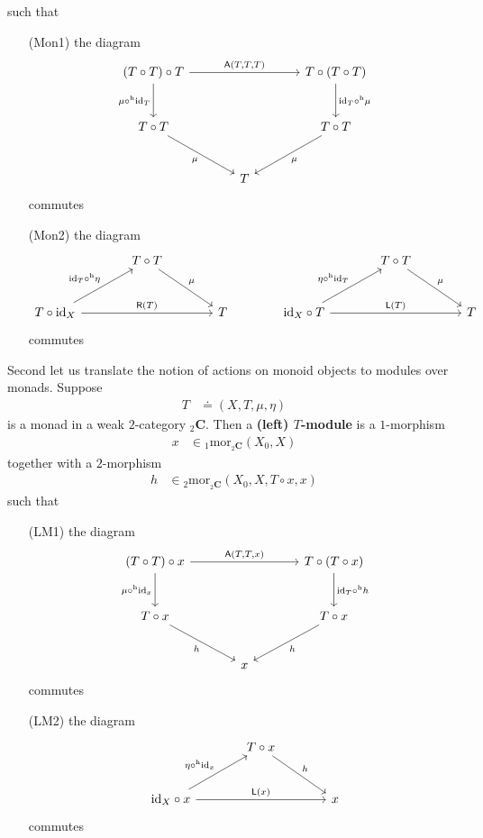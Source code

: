 such that
\begin{enumerate}
\item[(Mon1)]
the diagram
\[
\begin{tikzcd}[sep=large]
  \left(
    T
    \circ
    T
  \right)
  \circ
  T
  \arrow{rr}{\mathsf{A}(T,T,T)}
  \arrow[swap]{d}{\mu \circ^{\textrm{h}} \mathrm{id}_{T}}
  &
  &
  T
  \circ
  \left(
    T
    \circ
    T
  \right)
  \arrow{d}{\mathrm{id}_{T} \circ^{\textrm{h}} \mu}
  \\
  T
  \circ
  T
  \arrow[swap]{dr}{\mu}
  &
  &
  T
  \circ
  T
  \arrow{dl}{\mu}
  \\
  &
  T
  &
\end{tikzcd}
\]
commutes
\item[(Mon2)]
the diagram
\[
\begin{tikzcd}[sep=large]
  &
  T
  \circ
  T
  \arrow{dr}{\mu}
  &
  &
  &
  T
  \circ
  T
  \arrow{dr}{\mu}
  &
  \\
  T
  \circ
  \mathrm{id}_{X}
  \arrow{ur}{\mathrm{id}_{T} \circ^{\textrm{h}} \eta}
  \arrow{rr}{\mathsf{R}(T)}
  &
  &
  T
  &
  \mathrm{id}_{X}
  \circ
  T
  \arrow{ur}{\eta \circ^{\textrm{h}} \mathrm{id}_{T}}
  \arrow{rr}{\mathsf{L}(T)}
  &
  &
  T
\end{tikzcd}
\]
commutes
\end{enumerate}
Second let us translate the notion of actions on monoid objects to modules over monads. Suppose
\begin{align*}
  T
  &\doteq
  (X,T,\mu,\eta)
\end{align*}
is a monad in a weak $2$-category ${}_{2}\mathbf{C}$. Then a \textbf{(left) $T$-module} is a $1$-morphism
\begin{align*}
  x
  &\in
  {}_{1}\mathrm{mor}_{{}_{2}\mathbf{C}}(X_{0},X)
\end{align*}
together with a $2$-morphism
\begin{align*}
  h
  &\in
  {}_{2}\mathrm{mor}_{{}_{2}\mathbf{C}}
  \left(
    X_{0},
    X,
    T
    \circ
    x,
    x
  \right)
\end{align*}
such that
\begin{enumerate}
\item[(LM1)]
the diagram
\[
\begin{tikzcd}[sep=large]
  \left(
    T
    \circ
    T
  \right)
  \circ
  x
  \arrow{rr}{\mathsf{A}(T,T,x)}
  \arrow[swap]{d}{\mu \circ^{\textrm{h}} \mathrm{id}_{x}}
  &
  &
  T
  \circ
  \left(
    T
    \circ
    x
  \right)
  \arrow{d}{\mathrm{id}_{T} \circ^{\textrm{h}} h}
  \\
  T
  \circ
  x
  \arrow[swap]{dr}{h}
  &
  &
  T
  \circ
  x
  \arrow{dl}{h}
  \\
  &
  x
  &
\end{tikzcd}
\]
commutes
\item[(LM2)]
the diagram
\[
\begin{tikzcd}[sep=large]
  &
  T
  \circ
  x
  \arrow{dr}{h}
  &
  \\
  \mathrm{id}_{X}
  \circ
  x
  \arrow{ur}{\eta \circ^{\textrm{h}} \mathrm{id}_{x}}
  \arrow{rr}{\mathsf{L}(x)}
  &
  &
  x
\end{tikzcd}
\]
commutes
\end{enumerate}
